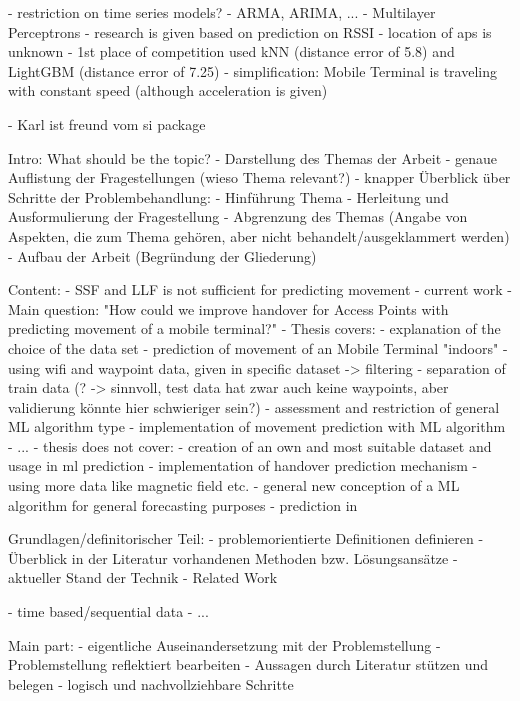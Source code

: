 


- restriction on time series models?
    - ARMA, ARIMA, ...
    - Multilayer Perceptrons
    - research is given based on prediction on RSSI 
    - location of aps is unknown
- 1st place of competition used kNN (distance error of 5.8) and LightGBM (distance error of 7.25)
- simplification: Mobile Terminal is traveling with constant speed (although acceleration is given)

- Karl ist freund vom si package

Intro:
    What should be the topic?
        - Darstellung des Themas der Arbeit
        - genaue Auflistung der Fragestellungen (wieso Thema relevant?)
        - knapper Überblick über Schritte der Problembehandlung:
            - Hinführung Thema
            - Herleitung und Ausformulierung der Fragestellung
            - Abgrenzung des Themas (Angabe von Aspekten, die zum Thema gehören, aber nicht behandelt/ausgeklammert werden)
            - Aufbau der Arbeit (Begründung der Gliederung)

    Content:
        - SSF and LLF is not sufficient for predicting movement
        - current work
        - Main question: "How could we improve handover for Access Points with predicting movement of a mobile terminal?"
        - Thesis covers:
            - explanation of the choice of the data set
            - prediction of movement of an Mobile Terminal "indoors"
                - using wifi and waypoint data, given in specific dataset -> filtering
                - separation of train data (? -> sinnvoll, test data hat zwar auch keine waypoints, aber validierung könnte hier schwieriger sein?)
            - assessment and restriction of general ML algorithm type
            - implementation of movement prediction with ML algorithm
            - ...
        - thesis does not cover:
            - creation of an own and most suitable dataset and usage in ml prediction
            - implementation of handover prediction mechanism
            - using more data like magnetic field etc.
            - general new conception of a ML algorithm for general forecasting purposes
            - prediction in

Grundlagen/definitorischer Teil:
    - problemorientierte Definitionen definieren
    - Überblick in der Literatur vorhandenen Methoden bzw. Lösungsansätze
    - aktueller Stand der Technik
    - Related Work

- time based/sequential data
- ...

Main part:
    - eigentliche Auseinandersetzung mit der Problemstellung
        - Problemstellung reflektiert bearbeiten
        - Aussagen durch Literatur stützen und belegen
        - logisch und nachvollziehbare Schritte

